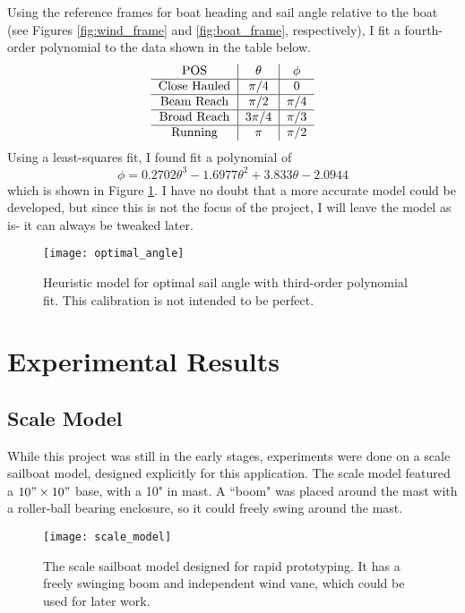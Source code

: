 \documentclass[letterpaper, 10 pt, conference]{ieeeconf}  %
\begin{document}

Using the reference frames for boat heading and sail angle relative to the boat (see Figures \ref{fig:wind_frame} and \ref{fig:boat_frame}, respectively), I fit a fourth-order polynomial to the data shown in the table below.
\[
\begin{tabular}{c|c|c}
POS & $\theta$ & $\phi$ \\\hline 
Close Hauled & $\pi/4$ & 0 \\\hline 
Beam Reach & $\pi/2$ & $\pi/4$ \\\hline 
Broad Reach & $3\pi/4$ & $\pi/3$\\\hline 
Running & $\pi$ & $\pi/2$\end{tabular}
\]
Using a least-squares fit, I found fit a polynomial of 
\[
\phi = 0.2702 \theta^3 -1.6977 \theta^2 + 3.833 \theta  -2.0944 
\]
which is shown in Figure \ref{fig:optimal}. I have no doubt that a more accurate model could be developed, but since this is not the focus of the project, I will leave the model as is- it can always be tweaked later. 
\begin{figure}[htbp]
   \centering
   \texttt{[image: optimal\_angle]} %
   \caption{Heuristic model for optimal sail angle with third-order polynomial fit. This calibration is not intended to be perfect.} 
   \label{fig:optimal}
\end{figure}

\section{Experimental Results}
\subsection{Scale Model}
\label{sec:scale}
While this project was still in the early stages, experiments were done on a scale sailboat model, designed explicitly for this application. The scale model featured a $10"\times 10"$ base, with a  10" in mast. A ``boom" was placed around the mast with a roller-ball bearing enclosure, so it could freely swing around the mast. 
\begin{figure}[htbp]
  \centering
   \texttt{[image: scale\_model]} 
  \caption{The scale sailboat model designed for rapid prototyping. It has a freely swinging boom and independent wind vane, which could be used for later work.}
   \label{fig:scale}
\end{figure}
\end{document}
